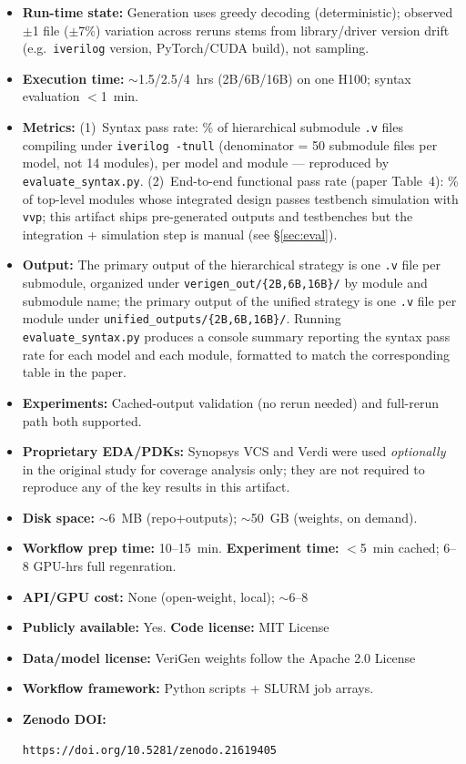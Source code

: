\documentclass[sigplan,10pt,twocolumn]{acmart}
\begin{document}
\begin{itemize}
  \item \textbf{Run-time state:} Generation uses greedy decoding
        (deterministic); observed $\pm$1 file ($\pm$7\%) variation across
        reruns stems from library/driver version drift (e.g.\
        \texttt{iverilog} version, PyTorch/CUDA build), not sampling.
  \item \textbf{Execution time:} $\sim$1.5/2.5/4~hrs (2B/6B/16B) on one H100;
        syntax evaluation $<$1~min.
  \item \textbf{Metrics:} (1)~Syntax pass rate: \% of hierarchical submodule
        \texttt{.v} files compiling under \texttt{iverilog -tnull}
        (denominator = 50 submodule files per model, not 14 modules), per
        model and module --- reproduced by \texttt{evaluate\_syntax.py}.
        (2)~End-to-end functional pass rate (paper Table~4): \% of top-level
        modules whose integrated design passes testbench simulation with
        \texttt{vvp}; this artifact ships pre-generated outputs and
        testbenches but the integration + simulation step is manual (see
        \S\ref{sec:eval}).
  \item \textbf{Output:} The primary output of the hierarchical strategy is
        one \texttt{.v} file per submodule, organized under
        \texttt{verigen\_out/\{2B,6B,16B\}/} by module and submodule name;
        the primary output of the unified strategy is one \texttt{.v} file
        per module under \texttt{unified\_outputs/\{2B,6B,16B\}/}. Running
        \texttt{evaluate\_syntax.py} produces a console summary reporting
        the syntax pass rate for each model and each module, formatted to
        match the corresponding table in the paper.
  \item \textbf{Experiments:} Cached-output validation (no rerun needed) and
        full-rerun path both supported.
  \item \textbf{Proprietary EDA/PDKs:} Synopsys VCS and Verdi were used
        \emph{optionally} in the original study for coverage analysis
        only; they are not required to reproduce any of the key results
        in this artifact.
  \item \textbf{Disk space:} $\sim$6~MB (repo+outputs); $\sim$50~GB (weights,
        on demand).
  \item \textbf{Workflow prep time:} 10--15~min. \quad
        \textbf{Experiment time:} $<$5~min cached; 6--8 GPU-hrs full regenration.
  \item \textbf{API/GPU cost:} None (open-weight, local); $\sim$6--8
  \item \textbf{Publicly available:} Yes. \quad \textbf{Code license:} MIT License
  \item \textbf{Data/model license:} VeriGen weights follow the Apache 2.0 License
  \item \textbf{Workflow framework:} Python scripts + SLURM job arrays.
  \item \textbf{Zenodo DOI:} 
\begin{lstlisting}
https://doi.org/10.5281/zenodo.21619405
\end{lstlisting}

\end{itemize}
\end{document}
